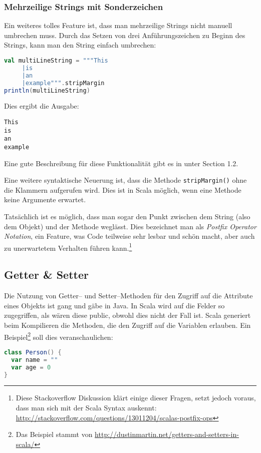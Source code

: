 \subsubsection{Mehrzeilige Strings mit Sonderzeichen}
Ein weiteres tolles Feature ist, dass man mehrzeilige Strings nicht manuell umbrechen muss. Durch das Setzen von drei Anführungszeichen zu Beginn des Strings, kann man den String einfach umbrechen:

\begin{lstlisting}[language=Scala]
val multiLineString = """This
     |is
     |an
     |example""".stripMargin
println(multiLineString)
\end{lstlisting}

Dies ergibt die Ausgabe:

\begin{verbatim}
This
is
an
example
\end{verbatim}

Eine gute Beschreibung für diese Funktionalität gibt es in \cite{ScalaCookbook} unter Section 1.2.

Eine weitere syntaktische Neuerung ist, dass die Methode \texttt{stripMargin()} ohne die Klammern aufgerufen wird. Dies ist in Scala möglich, wenn eine Methode keine Argumente erwartet.

Tatsächlich ist es möglich, dass man sogar den Punkt zwischen dem String (also dem Objekt) und der Methode weglässt. Dies bezeichnet man als \textit{Postfix Operator Notation}, ein Feature, was Code teilweise sehr lesbar und schön macht, aber auch zu unerwartetem Verhalten führen kann.\footnote{Diese Stackoverflow Diskussion klärt einige dieser Fragen, setzt jedoch voraus, dass man sich mit der Scala Syntax auskennt: \url{http://stackoverflow.com/questions/13011204/scalas-postfix-ops}}

\subsection{Getter \& Setter}\label{sec:getter-and-setter}
Die Nutzung von Getter-- und Setter--Methoden für den Zugriff auf die Attribute eines Objekts ist gang und gäbe in Java. In Scala wird auf die Felder so zugegriffen, als wären diese public, obwohl dies nicht der Fall ist. Scala generiert beim Kompilieren die Methoden, die den Zugriff auf die Variablen erlauben. Ein Beispiel\footnote{Das Beispiel stammt von \url{http://dustinmartin.net/getters-and-setters-in-scala/}} soll dies veranschaulichen:

\begin{lstlisting}[language=Scala, caption=Beispiel Klasse Person]
class Person() {
  var name = ""
  var age = 0
}
\end{lstlisting}

